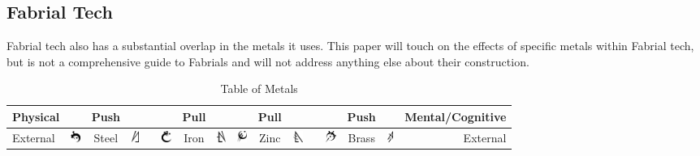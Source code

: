 \documentclass[conference]{IEEEtran}
\begin{document}
\subsection*{Fabrial Tech}
Fabrial tech also has a substantial overlap in the metals it uses.\cite{RoW-E7}  This paper will touch on the effects of specific metals within Fabrial tech, but is not a comprehensive guide to Fabrials and will not address anything else about their construction.
\begin{table}[!hb]
	
	\caption{Table of Metals}
	\centering
	\begin{tabular}{ |l |ccc c ccc | ccc c ccc | r| }
		\hline
		Physical&&Push&&&&Pull&&&Pull&&&&Push&&Mental/Cognitive\\\hline
		External&\includegraphics[height=1em]{images/Steel.png}& Steel & \includegraphics[height=1em]{images/Steel_(Feruchemy).png}&&\includegraphics[height=1em]{images/Iron.png}& Iron& \includegraphics[height=1em]{images/Iron_(Feruchemy).png}&\includegraphics[height=1em]{images/Zinc.png} &Zinc& \includegraphics[height=1em]{images/Zinc_(Feruchemy).png}&&\includegraphics[height=1em]{images/Brass.png}& Brass& \includegraphics[height=1em]{images/Brass_(Feruchemy).png}&External\\

\end{tabular}
\end{table}
\end{document}
